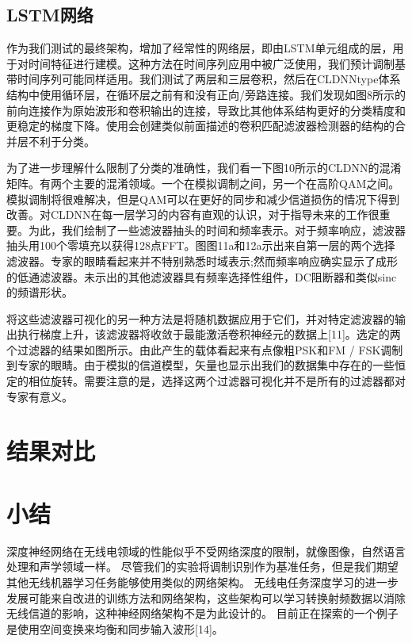 \subsection{LSTM网络}

作为我们测试的最终架构，增加了经常性的网络层，即由LSTM单元组成的层，用于对时间特征进行建模。这种方法在时间序列应用中被广泛使用，我们预计调制基带时间序列可能同样适用。我们测试了两层和三层卷积，然后在CLDNNtype体系结构中使用循环层，在循环层之前有和没有正向/旁路连接。我们发现如图8所示的前向连接作为原始波形和卷积输出的连接，导致比其他体系结构更好的分类精度和更稳定的梯度下降。使用会创建类似前面描述的卷积匹配滤波器检测器的结构的合并层不利于分类。\par

为了进一步理解什么限制了分类的准确性，我们看一下图10所示的CLDNN的混淆矩阵。有两个主要的混淆领域。一个在模拟调制之间，另一个在高阶QAM之间。模拟调制将很难解决，但是QAM可以在更好的同步和减少信道损伤的情况下得到改善。对CLDNN在每一层学习的内容有直观的认识，对于指导未来的工作很重要。为此，我们绘制了一些滤波器抽头的时间和频率表示。对于频率响应，滤波器抽头用100个零填充以获得128点FFT。图图11a和12a示出来自第一层的两个选择滤波器。专家的眼睛看起来并不特别熟悉时域表示;然而频率响应确实显示了成形的低通滤波器。未示出的其他滤波器具有频率选择性组件，DC阻断器和类似sinc的频谱形状。\par

将这些滤波器可视化的另一种方法是将随机数据应用于它们，并对特定滤波器的输出执行梯度上升，该滤波器将收敛于最能激活卷积神经元的数据上[11]。选定的两个过滤器的结果如图所示。由此产生的载体看起来有点像粗PSK和FM / FSK调制到专家的眼睛。由于模拟的信道模型，矢量也显示出我们的数据集中存在的一些恒定的相位旋转。需要注意的是，选择这两个过滤器可视化并不是所有的过滤器都对专家有意义。\par
\section{结果对比}
\section{小结}
深度神经网络在无线电领域的性能似乎不受网络深度的限制，就像图像，自然语言处理和声学领域一样。 尽管我们的实验将调制识别作为基准任务，但是我们期望其他无线机器学习任务能够使用类似的网络架构。 无线电任务深度学习的进一步发展可能来自改进的训练方法和网络架构，这些架构可以学习转换射频数据以消除无线信道的影响，这种神经网络架构不是为此设计的。 目前正在探索的一个例子是使用空间变换来均衡和同步输入波形[14]。